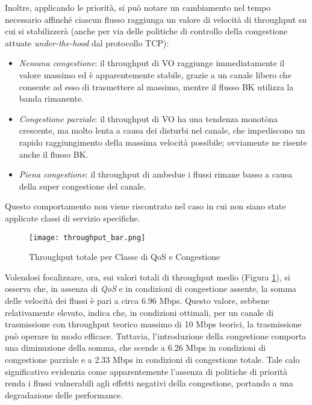 Inoltre, applicando le priorità, si può notare un cambiamento nel tempo necessario affinché ciascun flusso raggiunga un valore di velocità di throughput su cui si stabilizzerà (anche per via delle politiche di controllo della congestione attuate \textit{under-the-hood} dal protocollo TCP):
\begin{itemize}
    \item \textit{Nessuna congestione}: il throughput di VO raggiunge immediatamente il valore massimo ed è apparentemente stabile, grazie a un canale libero che consente ad esso di trasmettere al massimo, mentre il flusso BK utilizza la banda rimanente.
    \item \textit{Congestione parziale}: il throughput di VO ha una tendenza monotòna crescente, ma molto lenta a causa dei disturbi nel canale, che impediscono un rapido raggiungimento della massima velocità possibile; ovviamente ne risente anche il flusso BK.
    \item \textit{Piena congestione}: il throughput di ambedue i flussi rimane basso a causa della super congestione del canale.
\end{itemize}

\noindent Questo comportamento non viene riscontrato nel caso in cui non siano state applicate classi di servizio specifiche.

\begin{figure}[h!]
    \centering
    \texttt{[image: throughput\_bar.png]}
    \caption{Throughput totale per Classe di QoS e Congestione}
    \label{fig:throughput_bar}
\end{figure}

Volendosi focalizzare, ora, sui valori totali di throughput medio (Figura \ref{fig:throughput_bar}), si osserva che, in assenza di \textit{QoS} e in condizioni di congestione assente, la somma delle velocità dei flussi è pari a circa 6.96 Mbps. Questo valore, sebbene relativamente elevato, indica che, in condizioni ottimali, per un canale di trasmissione con throughput teorico massimo di 10 Mbps teorici, la trasmissione può operare in modo efficace. Tuttavia, l'introduzione della congestione comporta una diminuzione della somma, che scende a 6.26 Mbps in condizioni di congestione parziale e a 2.33 Mbps in condizioni di congestione totale. Tale calo significativo evidenzia come apparentemente l'assenza di politiche di priorità renda i flussi vulnerabili agli effetti negativi della congestione, portando a una degradazione delle performance.

